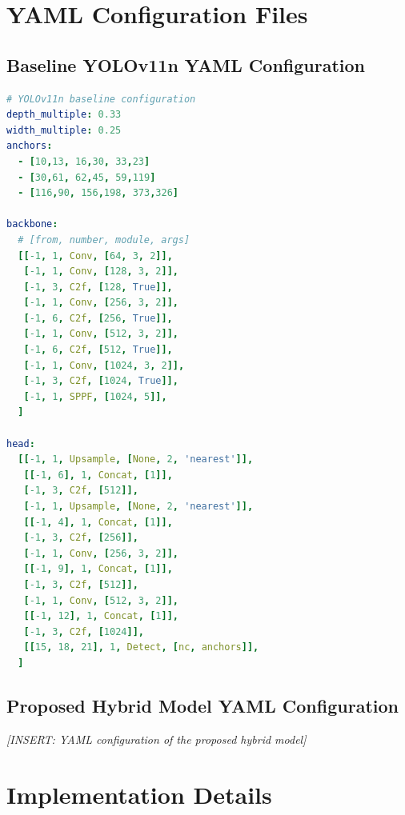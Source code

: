 \documentclass[11pt,a4paper]{article}
\begin{document}
\newpage


\appendix

\section{YAML Configuration Files}
\label{app:yaml}

\subsection{Baseline YOLOv11n YAML Configuration}

\begin{lstlisting}[language=YAML]
# YOLOv11n baseline configuration
depth_multiple: 0.33
width_multiple: 0.25
anchors:
  - [10,13, 16,30, 33,23]
  - [30,61, 62,45, 59,119]
  - [116,90, 156,198, 373,326]

backbone:
  # [from, number, module, args]
  [[-1, 1, Conv, [64, 3, 2]],
   [-1, 1, Conv, [128, 3, 2]],
   [-1, 3, C2f, [128, True]],
   [-1, 1, Conv, [256, 3, 2]],
   [-1, 6, C2f, [256, True]],
   [-1, 1, Conv, [512, 3, 2]],
   [-1, 6, C2f, [512, True]],
   [-1, 1, Conv, [1024, 3, 2]],
   [-1, 3, C2f, [1024, True]],
   [-1, 1, SPPF, [1024, 5]],
  ]

head:
  [[-1, 1, Upsample, [None, 2, 'nearest']],
   [[-1, 6], 1, Concat, [1]],
   [-1, 3, C2f, [512]],
   [-1, 1, Upsample, [None, 2, 'nearest']],
   [[-1, 4], 1, Concat, [1]],
   [-1, 3, C2f, [256]],
   [-1, 1, Conv, [256, 3, 2]],
   [[-1, 9], 1, Concat, [1]],
   [-1, 3, C2f, [512]],
   [-1, 1, Conv, [512, 3, 2]],
   [[-1, 12], 1, Concat, [1]],
   [-1, 3, C2f, [1024]],
   [[15, 18, 21], 1, Detect, [nc, anchors]],
  ]
\end{lstlisting}

\subsection{Proposed Hybrid Model YAML Configuration}

\textit{[INSERT: YAML configuration of the proposed hybrid model]}

\section{Implementation Details}
\label{app:implementation}
\end{document}
